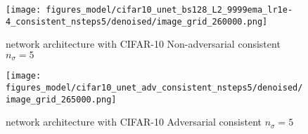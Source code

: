 \documentclass{article} \usepackage{iclr2021_conference_notitle,times}
\theoremstyle{definition}
\theoremstyle{definition}
\begin{document}
\begin{figure}[ht] 
    \centering
    \texttt{[image: figures\_model/cifar10\_unet\_bs128\_L2\_9999ema\_lr1e-4\_consistent\_nsteps5/denoised/image\_grid\_260000.png]}
    \caption{\citet{ho2020denoising} network architecture with CIFAR-10 Non-adversarial consistent $n_\sigma=5$} 
\end{figure}
\begin{figure}[ht] 
    \centering
    \texttt{[image: figures\_model/cifar10\_unet\_adv\_consistent\_nsteps5/denoised/image\_grid\_265000.png]}
    \caption{\citet{ho2020denoising} network architecture with CIFAR-10 Adversarial consistent $n_\sigma=5$} 
\end{figure}
\end{document}

